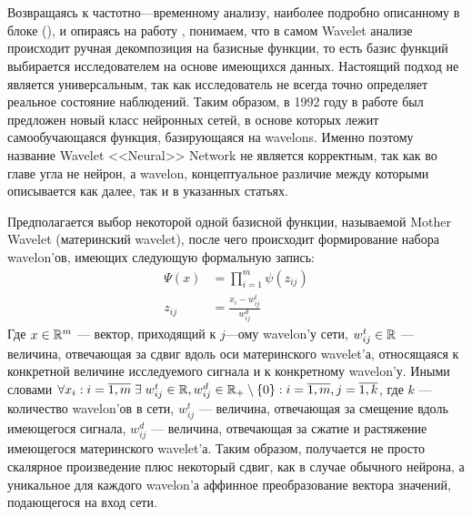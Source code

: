 \label{link::wavelet_nets}
\\\\
\indent Возвращаясь к частотно---временному анализу, наиболее подробно описанному в блоке (), и опираясь на работу \cite{alexandridis2014wavelet}, понимаем, что в самом Wavelet анализе происходит ручная декомпозиция на базисные функции, то есть базис функций выбирается исследователем на основе имеющихся данных. Настоящий подход не является универсальным, так как исследователь не всегда точно определяет реальное состояние наблюдений. Таким образом, в 1992 году в работе \cite{zhang1992wavelet} был предложен новый класс нейронных сетей, в основе которых лежит самообучающаяся функция, базирующаяся на wavelons. Именно поэтому название Wavelet <<Neural>> Network не является корректным, так как во главе угла не нейрон, а wavelon, концептуальное различие между которыми описывается как далее, так и в указанных статьях.

Предполагается выбор некоторой одной базисной функции, называемой Mother Wavelet (материнский wavelet), после чего происходит формирование набора wavelon'ов, имеющих следующую формальную запись:
\begin{equation}
	\begin{split}
		\Psi\left(x\right) & = \prod_{i = 1}^{m} \psi(z_{ij})\\
		z_{ij} & = \frac{x_i - w_{ij}^{t}}{w_{ij}^{d}}
	\end{split}
\end{equation}
\noindent Где $x \in \mathbb{R}^{m}$ --- вектор, приходящий к $j$---ому wavelon'у сети, $w_{ij}^{t} \in \mathbb{R}$ --- величина, отвечающая за сдвиг вдоль оси материнского wavelet'а, относящаяся к конкретной величине исследуемого сигнала и к конкретному wavelon'у. Иными словами $\forall x_{i}: i = \overline{1,m} \; \exists \; w_{ij}^t \in \mathbb{R}, w^{d}_{ij} \in \mathbb{R}_{+} \setminus \left\{0\right\}: i = \overline{1,m}, j = \overline{1,k}$, где $k$ --- количество wavelon'ов в сети, $w_{ij}^t$ --- величина, отвечающая за смещение вдоль имеющегося сигнала, $w_{ij}^d$ --- величина, отвечающая за сжатие и растяжение имеющегося материнского wavelet'а. Таким образом, получается не просто скалярное произведение плюс некоторый сдвиг, как в случае обычного нейрона, а уникальное для каждого wavelon'а аффинное преобразование вектора значений, подающегося на вход сети.

